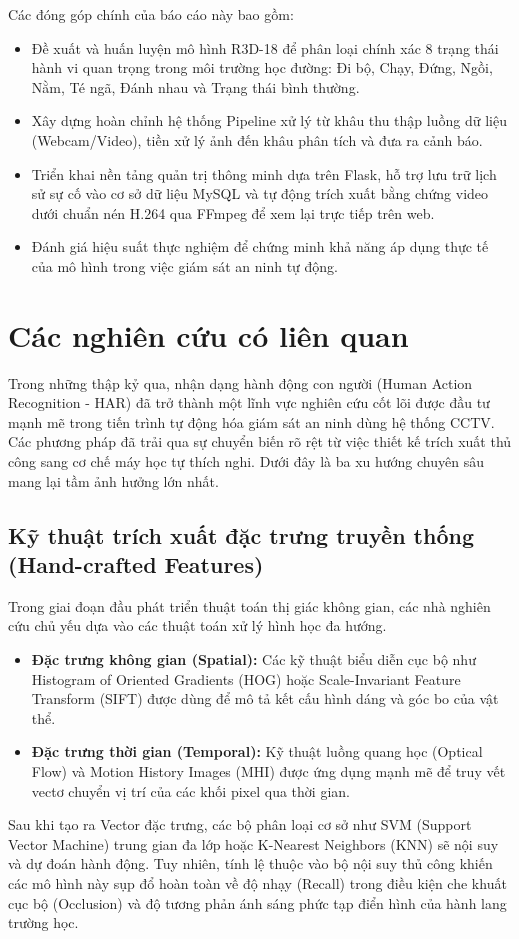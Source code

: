 \documentclass[conference]{IEEEtran}
\begin{document}
Các đóng góp chính của báo cáo này bao gồm:
\begin{itemize}
    \item Đề xuất và huấn luyện mô hình R3D-18 để phân loại chính xác 8 trạng thái hành vi quan trọng trong môi trường học đường: Đi bộ, Chạy, Đứng, Ngồi, Nằm, Té ngã, Đánh nhau và Trạng thái bình thường.
    \item Xây dựng hoàn chỉnh hệ thống Pipeline xử lý từ khâu thu thập luồng dữ liệu (Webcam/Video), tiền xử lý ảnh đến khâu phân tích và đưa ra cảnh báo.
    \item Triển khai nền tảng quản trị thông minh dựa trên Flask, hỗ trợ lưu trữ lịch sử sự cố vào cơ sở dữ liệu MySQL và tự động trích xuất bằng chứng video dưới chuẩn nén H.264 qua FFmpeg để xem lại trực tiếp trên web.
    \item Đánh giá hiệu suất thực nghiệm để chứng minh khả năng áp dụng thực tế của mô hình trong việc giám sát an ninh tự động.
\end{itemize}

\section{Các nghiên cứu có liên quan}
Trong những thập kỷ qua, nhận dạng hành động con người (Human Action Recognition - HAR) đã trở thành một lĩnh vực nghiên cứu cốt lõi được đầu tư mạnh mẽ trong tiến trình tự động hóa giám sát an ninh dùng hệ thống CCTV. Các phương pháp đã trải qua sự chuyển biến rõ rệt từ việc thiết kế trích xuất thủ công sang cơ chế máy học tự thích nghi. Dưới đây là ba xu hướng chuyên sâu mang lại tầm ảnh hưởng lớn nhất.

\subsection{Kỹ thuật trích xuất đặc trưng truyền thống (Hand-crafted Features)}
Trong giai đoạn đầu phát triển thuật toán thị giác không gian, các nhà nghiên cứu chủ yếu dựa vào các thuật toán xử lý hình học đa hướng. 
\begin{itemize}
    \item \textbf{Đặc trưng không gian (Spatial):} Các kỹ thuật biểu diễn cục bộ như Histogram of Oriented Gradients (HOG) hoặc Scale-Invariant Feature Transform (SIFT) được dùng để mô tả kết cấu hình dáng và góc bo của vật thể.
    \item \textbf{Đặc trưng thời gian (Temporal):} Kỹ thuật luồng quang học (Optical Flow) và Motion History Images (MHI) được ứng dụng mạnh mẽ để truy vết vectơ chuyển vị trí của các khối pixel qua thời gian.
\end{itemize}
Sau khi tạo ra Vector đặc trưng, các bộ phân loại cơ sở như SVM (Support Vector Machine) trung gian đa lớp hoặc K-Nearest Neighbors (KNN) sẽ nội suy và dự đoán hành động. Tuy nhiên, tính lệ thuộc vào bộ nội suy thủ công khiến các mô hình này sụp đổ hoàn toàn về độ nhạy (Recall) trong điều kiện che khuất cục bộ (Occlusion) và độ tương phản ánh sáng phức tạp điển hình của hành lang trường học.
\end{document}
